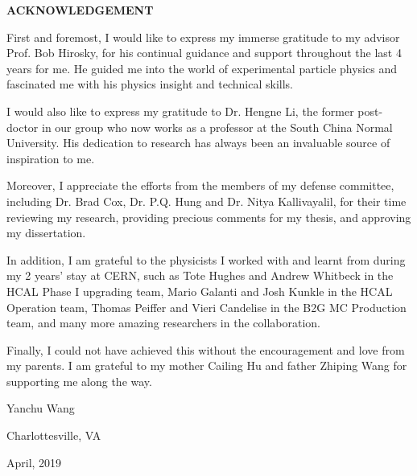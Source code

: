 \begin{center}
\textbf{\huge ACKNOWLEDGEMENT}
\end{center}
\vspace{0.5cm}

First and foremost, I would like to express my immerse gratitude to my advisor Prof. Bob Hirosky, for his continual guidance and support throughout the last 4 years for me. He guided me into the world of experimental particle physics and fascinated me with his physics insight and technical skills. 

\vspace{0.3cm}
I would also like to express my gratitude to Dr. Hengne Li, the former post-doctor in our group who now works as a professor at the South China Normal University. His dedication to research has always been an invaluable source of inspiration to me. 

\vspace{0.3cm}
Moreover, I appreciate the efforts from the members of my defense committee, including Dr. Brad Cox, Dr. P.Q. Hung and Dr. Nitya Kallivayalil, for their time reviewing my research, providing precious comments for my thesis, and approving my dissertation.

\vspace{0.3cm}
In addition, I am grateful to the physicists I worked with and learnt from during my 2 years' stay at CERN, such as Tote Hughes and Andrew Whitbeck in the HCAL Phase I upgrading team, Mario Galanti and Josh Kunkle in the HCAL Operation team, Thomas Peiffer and Vieri Candelise in the B2G MC Production team, and many more amazing researchers in the collaboration. 

\vspace{0.3cm}
Finally, I could not have achieved this without the encouragement and love from my parents. I am grateful to my mother Cailing Hu and father Zhiping Wang for supporting me along the way.
\vspace{0.5cm}
\begin{flushleft}
Yanchu Wang

Charlottesville, VA

April, 2019
\end{flushleft}
\newpage
